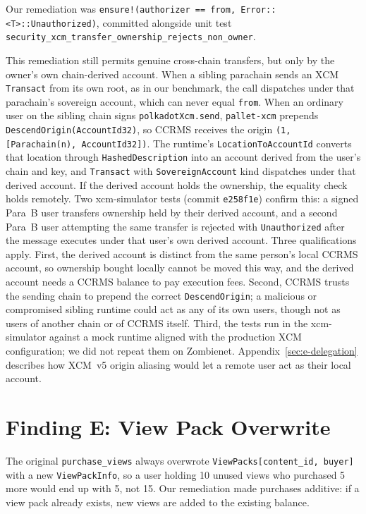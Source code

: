 Our remediation was \texttt{ensure!(authorizer == from,\allowbreak\ Error::<T>::Unauthorized)}, committed alongside unit test \texttt{security\_xcm\_transfer\_\allowbreak ownership\_\allowbreak rejects\_non\_owner}.

This remediation still permits genuine cross-chain transfers, but only by the owner's own chain-derived account. When a sibling parachain sends an XCM \texttt{Transact} from its own root, as in our benchmark, the call dispatches under that parachain's sovereign account, which can never equal \texttt{from}. When an ordinary user on the sibling chain signs \texttt{polkadotXcm.send}, \texttt{pallet-xcm} prepends \texttt{DescendOrigin(AccountId32)}, so CCRMS receives the origin \texttt{(1, [Parachain(n), AccountId32])}. The runtime's \texttt{LocationToAccountId} converts that location through \texttt{HashedDescription} into an account derived from the user's chain and key, and \texttt{Transact} with \texttt{SovereignAccount} kind dispatches under that derived account. If the derived account holds the ownership, the equality check holds remotely. Two xcm-simulator tests (commit \texttt{e258f1e}) confirm this: a signed Para~B user transfers ownership held by their derived account, and a second Para~B user attempting the same transfer is rejected with \texttt{Unauthorized} after the message executes under that user's own derived account. Three qualifications apply. First, the derived account is distinct from the same person's local CCRMS account, so ownership bought locally cannot be moved this way, and the derived account needs a CCRMS balance to pay execution fees. Second, CCRMS trusts the sending chain to prepend the correct \texttt{DescendOrigin}; a malicious or compromised sibling runtime could act as any of its own users, though not as users of another chain or of CCRMS itself. Third, the tests run in the xcm-simulator against a mock runtime aligned with the production XCM configuration; we did not repeat them on Zombienet. Appendix~\ref{sec:e-delegation} describes how XCM~v5 origin aliasing would let a remote user act as their local account.

\section{Finding E: View Pack Overwrite}\label{sec:d-finding-e}

The original \texttt{purchase\_views} always overwrote \texttt{ViewPacks[content\_id, buyer]} with a new \texttt{ViewPackInfo}, so a user holding 10 unused views who purchased 5 more would end up with 5, not 15. Our remediation made purchases additive: if a view pack already exists, new views are added to the existing balance.

